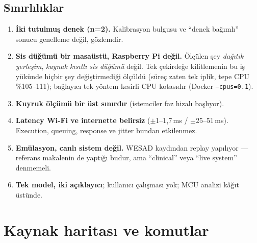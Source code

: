 \documentclass[11pt,a4paper]{article}
\newcommand{\ms}{\,ms}
\newcommand{\kod}[1]{\texttt{\small #1}}
\begin{document}
\subsection{Sınırlılıklar}

\begin{enumerate}[leftmargin=1.5em,itemsep=0.22em]
\item \textbf{İki tutulmuş denek (n=2).} Kalibrasyon bulgusu ve ``denek
bağımlı'' sonucu genelleme değil, gözlemdir.
\item \textbf{Sis düğümü bir masaüstü, Raspberry Pi değil.} Ölçülen şey
\emph{dağıtık yerleşim}, \emph{kaynak kısıtlı sis düğümü} değil. Tek çekirdeğe
kilitlemenin bu iş yükünde hiçbir şey değiştirmediği ölçüldü (süreç zaten tek
iplik, tepe CPU \%105--111); bağlayıcı tek yöntem kesirli CPU kotasıdır
(Docker \kod{--cpus=0.1}).
\item \textbf{Kuyruk ölçümü bir üst sınırdır} (istemciler faz hizalı başlıyor).
\item \textbf{Latency Wi-Fi ve internette belirsiz} ($\pm$1--1{,}7\ms{} /
$\pm$25--51\ms). Execution, queuing, response ve jitter bundan etkilenmez.
\item \textbf{Emülasyon, canlı sistem değil.} WESAD kaydından replay yapılıyor
--- referans makalenin de yaptığı budur, ama ``clinical'' veya ``live system''
denmemeli.
\item \textbf{Tek model, iki açıklayıcı}; kullanıcı çalışması yok; MCU analizi
kâğıt üstünde.
\end{enumerate}

\section{Kaynak haritası ve komutlar}
\end{document}
